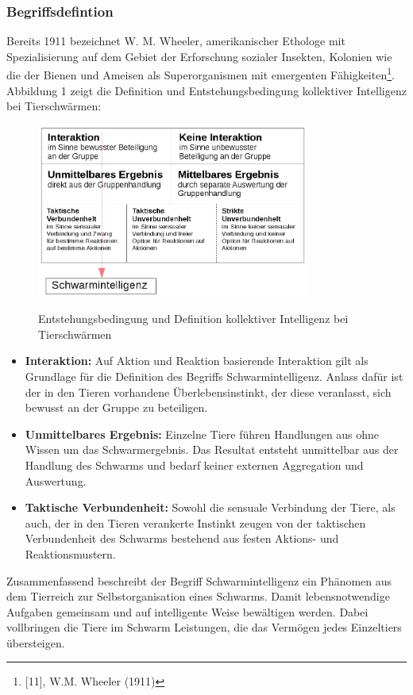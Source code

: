 \documentclass[a4paper, 11pt]{article}
\begin{document}
\subsubsection{Begriffsdefintion}
Bereits 1911 bezeichnet W. M. Wheeler, amerikanischer Ethologe mit Spezialisierung auf dem Gebiet der Erforschung sozialer Insekten, Kolonien wie die der Bienen und Ameisen als Superorganismen mit emergenten Fähigkeiten\footnote{[11], W.M. Wheeler (1911)}. Abbildung 1 zeigt die Definition und Entstehungsbedingung kollektiver Intelligenz bei Tierschwärmen:\newline
\addtocounter{footnote}{-1}
\begin{figure}[h]
	\begin{center}
	\includegraphics[width=0.8\textwidth]{schwarmintelligenz}
		\label{defabb}
	\end{center}
	\hspace{1in}\parbox{4in}{\caption[Entstehungsbedingung und Definition kollektiver Intelligenz bei Tierschwärmen]{Entstehungsbedingung und Definition kollektiver Intelligenz bei Tierschwärmen\footnotemark}}
\end{figure}
\begin{itemize}
	\item \textbf{Interaktion:} Auf Aktion und Reaktion basierende Interaktion gilt als Grundlage für die Definition des Begriffs Schwarmintelligenz. Anlass dafür ist der in den Tieren vorhandene Überlebensinstinkt, der diese veranlasst, sich bewusst an der Gruppe zu beteiligen.
	\item \textbf{Unmittelbares Ergebnis:} Einzelne Tiere führen Handlungen aus ohne Wissen um das Schwarmergebnis. Das Resultat entsteht unmittelbar aus der Handlung des Schwarms und bedarf keiner externen Aggregation und Auswertung.
	\item \textbf{Taktische Verbundenheit:} Sowohl die sensuale Verbindung der Tiere, als auch, der in den Tieren verankerte Instinkt zeugen von der taktischen Verbundenheit des Schwarms bestehend aus festen Aktions- und Reaktionsmustern. 
\end{itemize}
\par Zusammenfassend beschreibt der Begriff Schwarmintelligenz ein Phänomen aus dem Tierreich zur Selbstorganisation eines Schwarms. Damit lebensnotwendige Aufgaben gemeinsam und auf intelligente Weise bewältigen werden. Dabei vollbringen die Tiere im Schwarm Leistungen, die das Vermögen jedes Einzeltiers übersteigen.
\end{document}
